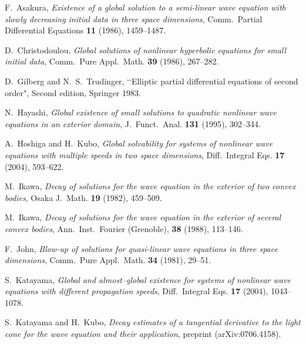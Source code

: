 \documentclass[12pt]{amsart}
\numberwithin{equation}{section}
\begin{document}
\begin{thebibliography}{99}

F.~Asakura,
{\it Existence of a global solution to a semi-linear wave equation
with slowly decreasing initial data in three space dimensions},
 Comm.~Partial Differential Equations
{\bf 11} (1986), 1459--1487.


D.~Christodoulou, 
{\it Global solutions of nonlinear hyperbolic equations for small initial data},
{Comm.~Pure Appl.~Math.}
{\bf 39} (1986), {267--282}.




D.~Gilberg and N.~S.~Trudinger,
\lq\lq Elliptic partial differential equations of second order",
Second edition, Springer 1983.


N.~Hayashi,
{\it
Global existence of small solutions to quadratic nonlinear wave
equations in an exterior domain},
 J.~Funct.~Anal.
{\bf 131} (1995), 302--344.

A.~Hoshiga and H.~Kubo,
{\it
Global solvability for systems of nonlinear wave equations
with multiple speeds in two space dimensions},
 Diff.~Integral Eqs.
{\bf 17} (2004), 593--622.

M.~Ikawa,
{\it Decay of solutions for the wave equation in the exterior of two convex
bodies}, 
Osaka J.~Math.
{\bf 19} (1982), 459--509.

M.~Ikawa,
{\it Decay of solutions for the wave equation in the exterior of several convex
bodies}, 
Ann.~Inst.~Fourier (Grenoble),
{\bf 38} (1988), 113--146.



F.~John,
{\it Blow-up of solutions for quasi-linear wave equations in three
space dimensions}, Comm.~Pure Appl.~Math. {\bf 34} (1981), 29--51.

S.~Katayama, 
    {\it Global and almost--global existence for
                systems of nonlinear wave equations with different
                propagation speeds}, 
  Diff.~Integral Eqs. {\bf 17} (2004), 1043--1078.
 
S.~Katayama and H.~Kubo,
{\it Decay estimates of a tangential derivative to 
the light cone for the wave equation and their application},
preprint (arXiv:0706.4158).


\end{thebibliography}
\end{document}

